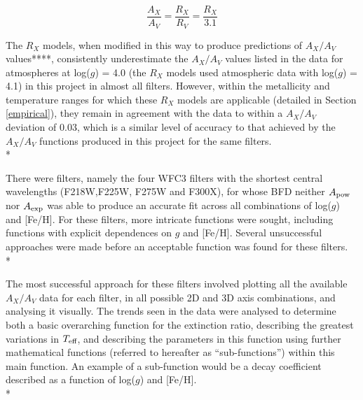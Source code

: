 \documentclass[12pt, a4paper]{report}
\begin{document}
\begin{equation}
\frac{A_{X}}{A_{V}} = \frac{R_{X}}{R_{V}} = \frac{R_{X}}{3.1}
\label{convert_Rx_to_Ax}
\end{equation}

The $R_{X}$ models, when modified in this way to produce predictions of $A_{X}/A_{V}$ values****, consistently underestimate the $A_{X}/A_{V}$ values listed in the data for atmospheres at log($g$) = 4.0 (the $R_{X}$ models used atmospheric data with log($g$) = 4.1) in this project in almost all filters. However, within the metallicity and temperature ranges for which these $R_{X}$ models are applicable (detailed in Section \ref{empirical}), they remain in agreement with the data to within a $A_{X}/A_{V}$ deviation of 0.03, which is a similar level of accuracy to that achieved by the $A_{X}/A_{V}$ functions produced in this project for the same filters.\\*

There were filters, namely the four WFC3 filters with the shortest central wavelengths (F218W,F225W, F275W and F300X), for whose BFD neither $A_{\textnormal{pow}}$ nor $A_{\textnormal{exp}}$ was able to produce an accurate fit across all combinations of log($g$) and [Fe/H]. For these filters, more intricate functions were sought, including functions with explicit dependences on $g$ and [Fe/H]. Several unsuccessful approaches were made before an acceptable function was found for these filters.\\*

The most successful approach for these filters involved plotting all the available $A_{X}/A_{V}$ data for each filter, in all possible 2D and 3D axis combinations, and analysing it visually. The trends seen in the data were analysed to determine both a basic overarching function for the extinction ratio, describing the greatest variations in $T_{\textnormal{eff}}$, and describing the parameters in this function using further mathematical functions (referred to hereafter as ``sub-functions'') within this main function. An example of a sub-function would be a decay coefficient described as a function of log($g$) and [Fe/H].\\*
\end{document}
